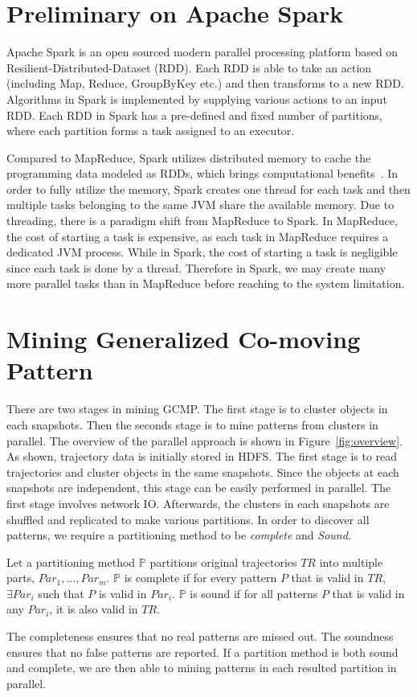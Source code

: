\section{Preliminary on Apache Spark}
Apache Spark is an open sourced modern parallel processing platform
based on Resilient-Distributed-Dataset (RDD). Each RDD is able to take an action (including Map, Reduce, GroupByKey etc.) and then transforms to a new RDD. Algorithms in Spark is implemented by supplying various actions to an input RDD. Each RDD in Spark has a pre-defined and fixed number of partitions, where each partition forms a task assigned to an executor.

Compared to MapReduce, Spark 
utilizes distributed memory to cache the programming data modeled as RDDs, which brings computational benefits~\cite{shi2015clash}. In order to fully utilize the memory, Spark creates one thread for each task and then multiple tasks belonging to the same JVM share the available memory.
Due to threading, there is a paradigm shift from MapReduce to Spark. In MapReduce, the cost of starting a task is expensive, as each task in MapReduce requires a dedicated JVM process. While in Spark, the cost of starting a task is negligible since each task is done by a thread.  Therefore in Spark, we may create many more parallel tasks than in MapReduce before reaching to the system limitation.


\section{Mining Generalized Co-moving Pattern}
There are two stages in mining GCMP. The first stage is to cluster objects in each snapshots. Then the seconds stage is to mine patterns from clusters in parallel. The overview of the parallel approach is 
shown in Figure~\ref{fig:overview}. As shown, trajectory data is initially stored in HDFS. The first stage is to 
read trajectories and cluster objects in the same snapshots. Since the objects at each snapshots are independent, this stage can be easily performed in parallel. The first stage involves network IO. Afterwards, the clusters in each snapshots are shuffled and replicated to make various partitions.
In order to discover all patterns, we require a partitioning method to be \emph{complete} and \emph{Sound}. 

\begin{definition}
Let a partitioning method $\mathbb{P}$ partitions original trajectories $TR$ into multiple parts, $Par_1,...,Par_m$. $\mathbb{P}$ is complete if for every pattern $P$ that is valid in $TR$, $\exists Par_i$ such that $P$ is valid in $Par_i$. $\mathbb{P}$ is sound if for all patterns $P$ that is valid in any $Par_i$, it is also valid in $TR$.
\end{definition}
The completeness ensures that no real patterns are missed out. The soundness ensures that no false patterns are reported. If a partition method is both sound and complete, we are then able to mining patterns in each resulted partition in parallel.

